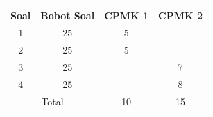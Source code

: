 \documentclass[11pt,letterpaper]{article}
\begin{document}
\begin{center}
  \begin{tabular}{|c|c|c|c|}
    \hline
    Soal                        & Bobot Soal & CPMK 1 & CPMK 2 \\ \hline
    1                           & 25         & 5      &        \\ \hline
    2                           & 25         & 5      &        \\ \hline
    3                           & 25         &        & 7      \\ \hline
    4                           & 25         &        & 8      \\ \hline
    \multicolumn{2}{|c|}{Total} & 10         & 15              \\ \hline
  \end{tabular}
\end{center}
\end{document}
